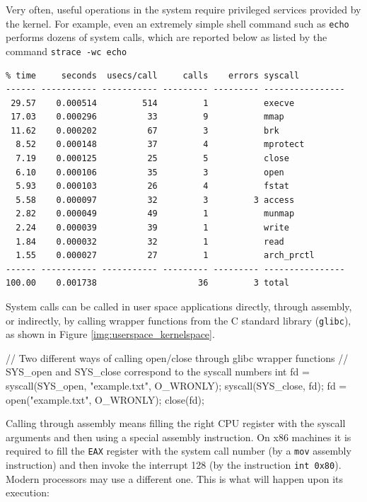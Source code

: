 Very often, useful operations in the system require privileged services provided by the kernel. For example, even an extremely simple shell command such as \verb|echo| performs dozens of system calls, which are reported below as listed by the command \verb|strace -wc echo|
\begin{Verbatim}
% time     seconds  usecs/call     calls    errors syscall
------ ----------- ----------- --------- --------- ----------------
 29.57    0.000514         514         1           execve
 17.03    0.000296          33         9           mmap
 11.62    0.000202          67         3           brk
  8.52    0.000148          37         4           mprotect
  7.19    0.000125          25         5           close
  6.10    0.000106          35         3           open
  5.93    0.000103          26         4           fstat
  5.58    0.000097          32         3         3 access
  2.82    0.000049          49         1           munmap
  2.24    0.000039          39         1           write
  1.84    0.000032          32         1           read
  1.55    0.000027          27         1           arch_prctl
------ ----------- ----------- --------- --------- ----------------
100.00    0.001738                    36         3 total
\end{Verbatim}
System calls can be called in user space applications directly, through assembly, or indirectly, by calling wrapper functions from the C standard library (\verb|glibc|), as shown in Figure \ref{img:userspace_kernelspace}. 
\begin{code}
// Two different ways of calling open/close through glibc wrapper functions 
// SYS_open and SYS_close correspond to the syscall numbers
int fd = syscall(SYS_open, "example.txt", O_WRONLY);
syscall(SYS_close, fd);
fd = open("example.txt", O_WRONLY);
close(fd);
\end{code}
Calling through assembly means filling the right CPU register with the syscall arguments and then using a special assembly instruction. On x86 machines it is required to fill the \verb|EAX| register with the system call number (by a \verb|mov| assembly instruction) and then invoke the interrupt 128 (by the instruction \verb|int 0x80|). Modern processors may use a different one. This is what will happen upon its execution:
